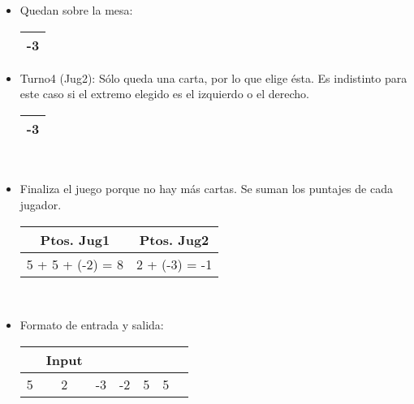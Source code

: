 \documentclass[11pt, a4paper, twoside]{article}
\begin{document}
\begin{ejemplo}
\begin{samepage}
\begin{itemize}
    \item Quedan sobre la mesa:   
      \begin{center}
        \begin{tabular}{|c|}
          \hline
           -3 \\
          \hline
        \end{tabular}
      \end{center}    

    \item Turno4 (Jug2): Sólo queda una carta, por lo que elige ésta. Es indistinto para este caso 
        si el extremo elegido es el izquierdo o el derecho. 
        \begin{tabular}{|c|}
          \hline
           -3 \\
          \hline
        \end{tabular} \\

    \item Finaliza el juego porque no hay más cartas. Se suman los puntajes de cada jugador.\\
      \begin{center}
        \begin{tabular}{|c|c|}
          \hline
          Ptos. Jug1 & Ptos. Jug2 \\
          \hline
          5 + 5 + (-2) = 8 & 2 + (-3) = -1 \\
          \hline
        \end{tabular} \\ 
      \end{center}  
      
    \item Formato de entrada y salida: \\
     \begin{center} 
      \begin{minipage}{0.5\textwidth}
          \begin{tabular}{ccccccc}
             &Input \\
			 \hline 
			 5 & 2 & -3 & -2 & 5 & 5 \\
          \end{tabular}
      \end{minipage}  	
    \end{center}

\end{itemize}

\end{samepage}


\end{ejemplo}
\end{document}
